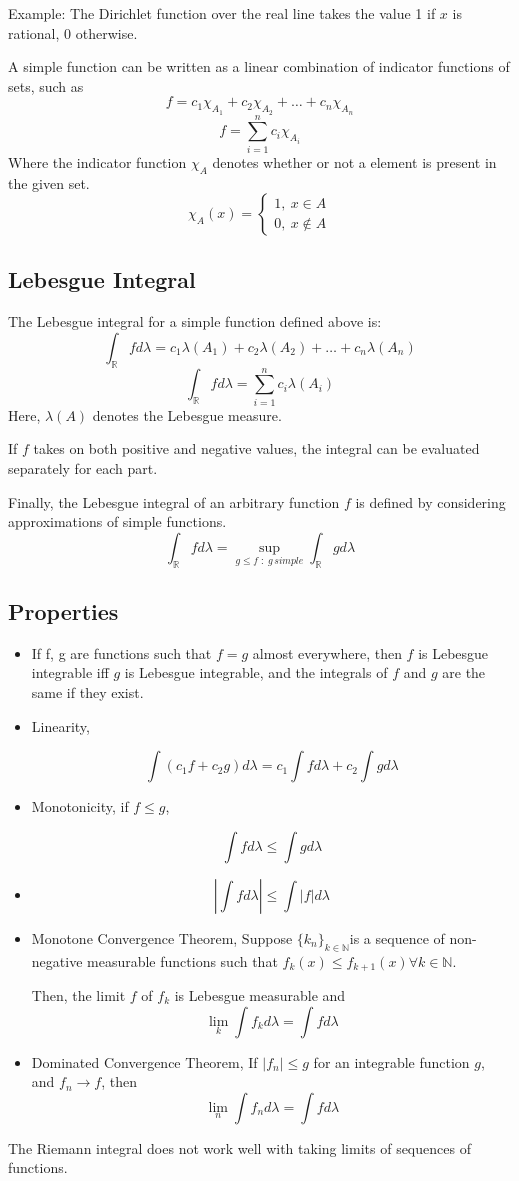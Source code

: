 \documentclass{article}
\begin{document}
Example: The Dirichlet function over the real line takes the value 1 if $x$ is rational, 0 otherwise.

A simple function can be written as a linear combination of indicator functions of sets, such as
$$f = c_1\chi_{A_1} +c_2\chi_{A_2}+\dots+c_n\chi_{A_n}$$
$$f = \sum \limits_{i=1}^nc_i\chi_{A_i}$$
Where the indicator function $\chi_A$ denotes whether or not a element is present in the given set.
$$\chi_A(x)=\begin{cases} 
    1 ,\ x \in A \\
    0 ,\ x \notin A
   \end{cases}$$
\subsection{Lebesgue Integral}
The Lebesgue integral for a simple function defined above is:
$$ \int_{\mathbb{R}} fd{\lambda}=c_1\lambda (A_1)+c_2\lambda (A_2)+\dots+c_n\lambda (A_n)$$
$$ \int_{\mathbb{R}} fd{\lambda}=\sum \limits_{i=1}^n c_i\lambda (A_i)$$
Here, $\lambda(A)$ denotes the Lebesgue measure.

If $f$ takes on both positive and negative values, the integral can be evaluated separately for each part.

Finally, the Lebesgue integral of an arbitrary function $f$ is defined by considering approximations of simple functions.
\[ \int_{\mathbb{R}} fd{\lambda}= \sup\limits_{g \leq f \;:\; g \,simple} \int_{\mathbb{R}} gd{\lambda}\]

\subsection{Properties}

\begin{itemize}
    \item     If f, g are functions such that $f = g$ almost everywhere, then $f$ is Lebesgue integrable iff $g$ is Lebesgue integrable, and the integrals of $f$ and $g$ are the same if they exist.
    \item Linearity,
    
    $$\int (c_1f+c_2g )d\lambda= c_1 \int f d\lambda+ c_2 \int g d\lambda$$
    \item Monotonicity, if $f\leq g$,
    
    $$\int f d\lambda \leq \int g d\lambda$$
    \item$$|{\int fd\lambda}| \leq \int |f|d\lambda$$ 
    \item Monotone Convergence Theorem, Suppose $\{ k_n\}_{k \in \mathbb{N}} $is a sequence of non-negative measurable functions such that
    $f_{k}(x) \leq f_{k+1}(x) \forall k \in \mathbb{N}.$
    
    Then, the limit $f$ of $f_k$ is Lebesgue measurable and
    \[ \lim_{k} \int f_k d\lambda = \int f d\lambda\]
    
    \item Dominated Convergence Theorem,  If $|f_n| \leq g$ for an integrable function $g$, and $f_n \to f$, then
    $$ \lim_{n}\int f_n d\lambda =\int f d\lambda$$
\end{itemize}
The Riemann integral does not work well with taking limits of sequences of functions. 
\end{document}
